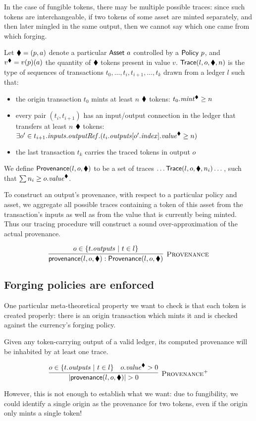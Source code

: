 In the case of fungible tokens, there may be multiple possible traces:
since such tokens are interchangeable, if two tokens of some asset are minted separately, and then
later mingled in the same output, then we cannot say which one came from which forging.

Let $\blacklozenge = (p , a)$ denote a particular $\textsf{Asset}\ a$ controlled by a $\textsf{Policy}\ p$,
and $v^\blacklozenge = v(p)(a)$ the quantity of $\blacklozenge$ tokens present in value $v$.
$\textsf{Trace}(l,o,\blacklozenge,n)$ is the type of sequences of transactions
$t_0,\dots, t_i, t_{i +1},\dots, t_k$ drawn from a ledger $l$ such that:
\begin{itemize}
\item the origin transaction $t_0$ mints at least $n$ $\blacklozenge$
  tokens: $t_0.\mathit{mint}^\blacklozenge \ge n$
\item every pair $(t_i,t_{i + 1})$ has an input/output connection in
  the ledger that transfers at least $n$ $\blacklozenge$ tokens:
  $\exists o' \in t_{i + 1}.\mathit{inputs}.\mathit{outputRef}. (t_i.\mathit{outputs}[o'.\mathit{index}].\mathit{value}^\blacklozenge \ge n)$
\item the last transaction $t_k$ carries the traced tokens in output $o$
\end{itemize}
We define $\textsf{Provenance}(l,o,\blacklozenge)$ to be a
set of traces $\dots \textsf{Trace}(l,o,\blacklozenge,n_i)\dots$, such that $\sum n_i \ge o.\mathit{value}^\blacklozenge$.

To construct an output's provenance, with respect to
a particular policy and asset, we aggregate all possible
traces containing a token of this asset from the transaction's inputs as well
as from the value that is currently being minted.
Thus our tracing procedure will construct a sound over-approximation of the actual provenance.

\begin{displaymath}
\infer[\textsc{Provenance}]
  {\provenance(l,o,\nft) : \Provenance(l,o,\nft)}
  {o \in \{ t.\outputs \ | \ t \in l \}}
\end{displaymath}

\subsection{Forging policies are enforced}

One particular meta-theoretical property we want to check is
that each token is created properly: there is an origin transaction which mints
it and is checked against the currency's forging policy.

\begin{proposition}
Given any token-carrying output of a valid ledger,
its computed provenance will be inhabited by at least one trace.

\begin{displaymath}
\infer[\textsc{Provenance}^+]
  {|\provenance(l, o, \nft)| > 0}
  {%
    o \in \{ t.\outputs \ | \ t \in l \}
  & o.\val^\nft > 0
  }
\end{displaymath}
\end{proposition}
%
However, this is not enough to establish what we want: due to
fungibility, we could identify a single origin as the provenance for
two tokens, even if the origin only mints a single token!

